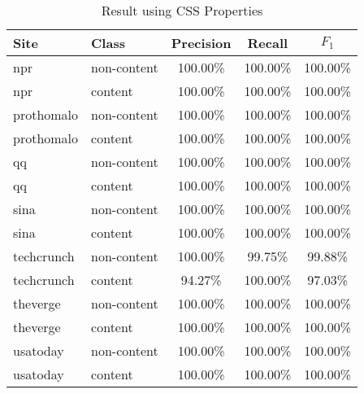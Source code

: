 \documentclass{acm_proc_article-sp}
\begin{document}
\begin{table}
\centering
\caption{\label{table:css}Result using CSS Properties}
\begin{tabular}{|l|l|c|c|c|} \hline
Site&Class&Precision&Recall&$F_1$\\ \hline\hline
npr&non-content&100.00\%&100.00\%&100.00\%\\ \hline
npr&content&100.00\%&100.00\%&100.00\%\\ \hline
prothomalo&non-content&100.00\%&100.00\%&100.00\%\\ \hline
prothomalo&content&100.00\%&100.00\%&100.00\%\\ \hline
qq&non-content&100.00\%&100.00\%&100.00\%\\ \hline
qq&content&100.00\%&100.00\%&100.00\%\\ \hline
sina&non-content&100.00\%&100.00\%&100.00\%\\ \hline
sina&content&100.00\%&100.00\%&100.00\%\\ \hline
techcrunch&non-content&100.00\%&99.75\%&99.88\%\\ \hline
techcrunch&content&94.27\%&100.00\%&97.03\%\\ \hline
theverge&non-content&100.00\%&100.00\%&100.00\%\\ \hline
theverge&content&100.00\%&100.00\%&100.00\%\\ \hline
usatoday&non-content&100.00\%&100.00\%&100.00\%\\ \hline
usatoday&content&100.00\%&100.00\%&100.00\%\\ \hline
\end{tabular}
\end{table}
\end{document}

